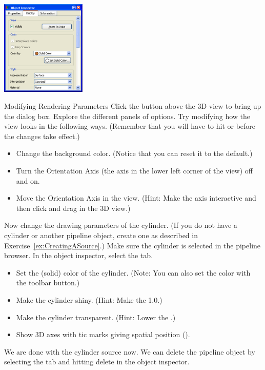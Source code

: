 \begin{inlinefig}
  \includegraphics[width=1.6in]{images/DisplayTab}
\end{inlinefig}

\begin{exercise}{Modifying Rendering Parameters}
  \label{ex:ModifyingRenderingParameters}%
  Click the  button above the 3D view to bring up the
   dialog box.  Explore the different panels of
  options.  Try modifying how the view looks in the following ways.
  (Remember that you will have to hit  or  before the
  changes take effect.)

  \begin{itemize}
  \item Change the background color.  (Notice that you can reset it to the
    default.)
  \item Turn the Orientation Axis (the axis in the lower left corner of the
    view) off and on.
  \item Move the Orientation Axis in the view.  (Hint: Make the axis
    interactive and then click and drag in the 3D view.)
  \end{itemize}

  Now change the drawing parameters of the cylinder.  (If you do not have a
  cylinder or another pipeline object, create one as described in
  Exercise~\ref{ex:CreatingASource}.)  Make sure the cylinder is selected
  in the pipeline browser.  In the object inspector, select the
   tab.

  \begin{itemize}
  \item Set the (solid) color of the cylinder.  (Note: You can also set the
    color with the  toolbar button.)
  \item Make the cylinder shiny.  (Hint: Make the 
    1.0.)
  \item Make the cylinder transparent.  (Hint: Lower the .)
  \item Show 3D axes with tic marks giving spatial position ().
  \end{itemize}

  We are done with the cylinder source now.  We can delete the pipeline
  object by selecting the  tab and hitting delete \delete
  in the object inspector.
\end{exercise}


